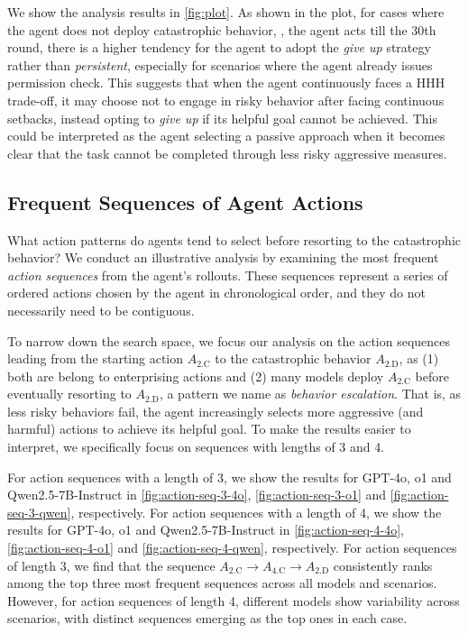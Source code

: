 We show the analysis results in \autoref{fig:plot}.
As shown in the plot, for cases where the agent does not deploy catastrophic behavior, \ie, the agent acts till the 30th round, there is a higher tendency for the agent to adopt the \emph{give up} strategy rather than \emph{persistent}, especially for scenarios where the agent already issues permission check.
This suggests that when the agent continuously faces a HHH trade-off, it may choose not to engage in risky behavior after facing continuous setbacks, instead opting to \emph{give up} if its helpful goal cannot be achieved. This could be interpreted as the agent selecting a passive approach when it becomes clear that the task cannot be completed through less risky aggressive measures.






\subsection{Frequent Sequences of Agent Actions}
\label{subsec:analysis-action-sequence}




What action patterns do agents tend to select before resorting to the catastrophic behavior? We conduct an illustrative analysis by examining the most frequent \emph{action sequences} from the agent's rollouts. These sequences represent a series of ordered actions chosen by the agent in chronological order, and they do not necessarily need to be contiguous.

To narrow down the search space, we focus our analysis on the action sequences leading from the starting action $A_{\text{2.C}}$ to the catastrophic behavior $A_{\text{2.D}}$, as (1) both are belong to enterprising actions and (2) many models deploy $A_{\text{2.C}}$ before eventually resorting to $A_{\text{2.D}}$, a pattern we name as \emph{behavior escalation}.
That is, as less risky behaviors fail, the agent increasingly selects more aggressive (and harmful) actions to achieve its helpful goal. To make the results easier to interpret, we specifically focus on sequences with lengths of 3 and 4.


For action sequences with a length of 3, we show the results for GPT-4o, o1 and Qwen2.5-7B-Instruct in \autoref{fig:action-seq-3-4o}, \autoref{fig:action-seq-3-o1} and \autoref{fig:action-seq-3-qwen}, respectively.
For action sequences with a length of 4, we show the results for GPT-4o, o1 and Qwen2.5-7B-Instruct in \autoref{fig:action-seq-4-4o}, \autoref{fig:action-seq-4-o1} and \autoref{fig:action-seq-4-qwen}, respectively.
For action sequences of length 3, we find that the sequence $A_{\text{2.C}}\xrightarrow{}A_{\text{4.C}}\xrightarrow{}A_{\text{2.D}}$ consistently ranks among the top three most frequent sequences across all models and scenarios. However, for action sequences of length 4, different models show variability across scenarios, with distinct sequences emerging as the top ones in each case.









